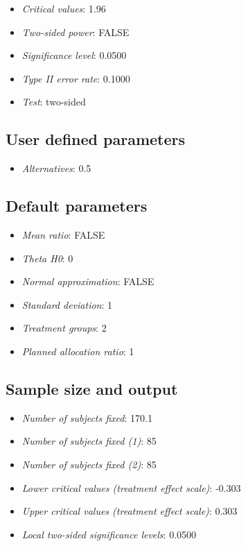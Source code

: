 \documentclass[
  letterpaper,
  DIV=11,
  numbers=noendperiod]{scrreprt}
\providecommand{\tightlist}{%
  \setlength{\itemsep}{0pt}\setlength{\parskip}{0pt}}\usepackage{longtable,booktabs,array}
\begin{document}
\begin{itemize}
\tightlist
\item
  \emph{Critical values}: 1.96
\item
  \emph{Two-sided power}: FALSE
\item
  \emph{Significance level}: 0.0500
\item
  \emph{Type II error rate}: 0.1000
\item
  \emph{Test}: two-sided
\end{itemize}

\hypertarget{user-defined-parameters-1}{%
\subsection{User defined parameters}\label{user-defined-parameters-1}}

\begin{itemize}
\tightlist
\item
  \emph{Alternatives}: 0.5
\end{itemize}

\hypertarget{default-parameters-1}{%
\subsection{Default parameters}\label{default-parameters-1}}

\begin{itemize}
\tightlist
\item
  \emph{Mean ratio}: FALSE
\item
  \emph{Theta H0}: 0
\item
  \emph{Normal approximation}: FALSE
\item
  \emph{Standard deviation}: 1
\item
  \emph{Treatment groups}: 2
\item
  \emph{Planned allocation ratio}: 1
\end{itemize}

\hypertarget{sample-size-and-output}{%
\subsection{Sample size and output}\label{sample-size-and-output}}

\begin{itemize}
\tightlist
\item
  \emph{Number of subjects fixed}: 170.1
\item
  \emph{Number of subjects fixed (1)}: 85
\item
  \emph{Number of subjects fixed (2)}: 85
\item
  \emph{Lower critical values (treatment effect scale)}: -0.303
\item
  \emph{Upper critical values (treatment effect scale)}: 0.303
\item
  \emph{Local two-sided significance levels}: 0.0500
\end{itemize}
\end{document}
